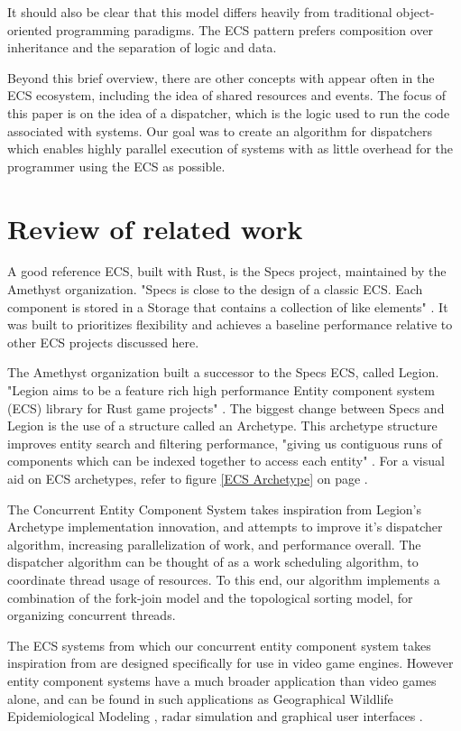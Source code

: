 \documentclass[conference]{IEEEtran}
\begin{document}
It should also be clear that this model differs heavily from traditional object-oriented programming paradigms. The ECS pattern prefers composition over inheritance and the separation of logic and data.

Beyond this brief overview, there are other concepts with appear often in the ECS ecosystem, including the idea of shared resources and events. The focus of this paper is on the idea of a dispatcher, which is the logic used to run the code associated with systems. Our goal was to create an algorithm for dispatchers which enables highly parallel execution of systems with as little overhead for the programmer using the ECS as possible. 

\section{Review of related work}
A good reference ECS, built with Rust, is the Specs project, maintained by the Amethyst organization. "Specs is close to the design of a classic ECS. Each component is stored in a Storage that contains a collection of like elements" \cite{sherratt_2020}. It was built to prioritizes flexibility and achieves a baseline performance relative to other ECS projects discussed here. 

The Amethyst organization built a successor to the Specs ECS, called Legion. "Legion aims to be a feature rich high performance Entity component system (ECS) library for Rust game projects" \cite{amethyst_github}. The biggest change between Specs and Legion is the use of a structure called an Archetype. This archetype structure improves entity search and filtering performance, "giving us contiguous runs of components which can be indexed together to access each entity" \cite{gillen_2020}. For a visual aid on ECS archetypes, refer to figure \ref{ECS Archetype} on page \pageref{ECS Archetype}. 

The Concurrent Entity Component System takes inspiration from Legion's Archetype implementation innovation, and attempts to improve it's dispatcher algorithm, increasing parallelization of work, and performance overall. The dispatcher algorithm can be thought of as a work scheduling algorithm, to coordinate thread usage of resources. To this end, our algorithm implements a combination of the fork-join model and the topological sorting model, for organizing concurrent threads. 

The ECS systems from which our concurrent entity component system takes inspiration from are designed specifically for use in video game engines. However entity component systems have a much broader application than video games alone, and can be found in such applications as Geographical Wildlife Epidemiological Modeling \cite{https://doi.org/10.1111/gean.12258}, radar simulation \cite{radar_ECS} and graphical user interfaces \cite{10.1145/3331150}.
\end{document}

